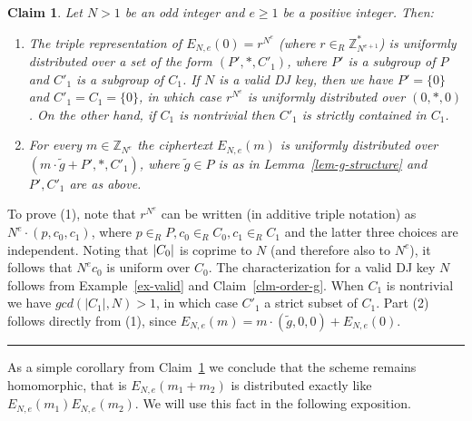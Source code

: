 \documentclass[11pt]{article}
\newtheorem{claim}[theorem]{Claim}
\newenvironment{proof}{\noindent {\bf Proof:} \hspace{.677em}}%
                     {\qed}
\newcommand{\qed}{\hspace*{\fill}\rule{0.6em}{0.6em}}
\newcommand{\encdj}{{E}_{N,e}}
\newcommand{\Z}{\mathbb{Z}}
\newcommand{\U}[1]{\mathbb{Z}_{#1}^*}
\newcommand{\mathify}[1]{\ifmmode{#1}\else\mbox{$#1$}\fi}
\newcommand{\size}[1]{\mathify{\left| #1 \right|}}
\begin{document}
\begin{claim}
\label{cl-djgeneral} Let $N>1$ be an odd integer and $e\ge 1$ be a
positive integer. Then:
\begin{enumerate}
\item The triple representation of $\encdj(0)=r^{N^e}$ (where
$r\in_R\U{N^{e+1}}$) is uniformly distributed over a
set of the form $(P',*,C'_1)$, where $P'$ is a subgroup of $P$ and
$C'_1$ is a subgroup of $C_1$. If $N$ is a valid DJ key, then we
have $P'=\{0\}$ and $C'_1=C_1=\{0\}$, in which case $r^{N^e}$ is
uniformly distributed over $(0,*,0)$. On the other hand, if $C_1$
is nontrivial then $C'_1$ is strictly contained in $C_1$.
\item For every $m\in\Z_{N^e}$
the ciphertext $\encdj(m)$ is uniformly distributed over
$(m\cdot\tilde{g}+P',*,C'_1)$, where $\tilde{g}\in P$ is as in
Lemma~\ref{lem-g-structure} and $P',C'_1$ are as above.
\end{enumerate}
\end{claim}
\begin{proof}
To prove (1), note that $r^{N^e}$ can be written (in additive
triple notation) as $N^e\cdot (p,c_0,c_1)$, where $p\in_R P,
c_0\in_R C_0, c_1\in_R C_1$ and the latter three choices are
independent. Noting that $\size{C_0}$ is coprime to $N$ (and
therefore also to $N^e$), it follows that $N^ec_0$ is uniform over
$C_0$. The characterization for a valid DJ key $N$ follows from
Example~\ref{ex-valid} and Claim~\ref{clm-order-g}. When $C_1$ is
nontrivial we have $gcd(|C_1|,N)>1$, in which case $C'_1$ a strict
subset of $C_1$. Part (2) follows directly from (1), since
$\encdj(m)= m\cdot (\tilde{g},0,0)+\encdj(0)$.
\end{proof}

As a simple corollary from Claim~\ref{cl-djgeneral} we conclude that the scheme remains 
homomorphic, that is $\encdj(m_1+m_2)$ is distributed exactly like $\encdj(m_1)\encdj(m_2)$.
We will use this fact in the following exposition.

%
\end{document}

